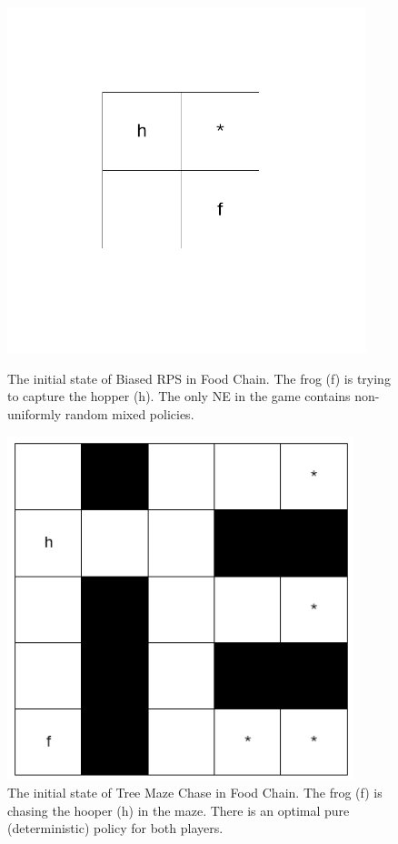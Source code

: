 \documentclass[]{interact}
\theoremstyle{plain}%
\theoremstyle{definition}
\theoremstyle{remark}
\begin{document}
\begin{figure}
\centering
    \begin{minipage}{0.48\textwidth}
        \centering
        \includegraphics[width=0.931\textwidth]{images/biased_rps.png}
        \caption{The initial state of Biased RPS in Food Chain. The frog (f) is trying to capture the hopper (h). The only NE in the game contains non-uniformly random mixed policies.}
        \label{fig:biased_rps_in_food_chain}
    \end{minipage}\hfill
    \begin{minipage}{0.48\textwidth}
        \centering
        \includegraphics[width=0.9\textwidth]{images/tree_maze_chase.png}
        \caption{The initial state of Tree Maze Chase in Food Chain. The frog (f) is chasing the hooper (h) in the maze. There is an optimal pure (deterministic) policy for both players.}
        \label{fig:tree_maze_chase}
    \end{minipage}
\end{figure}
\end{document}
